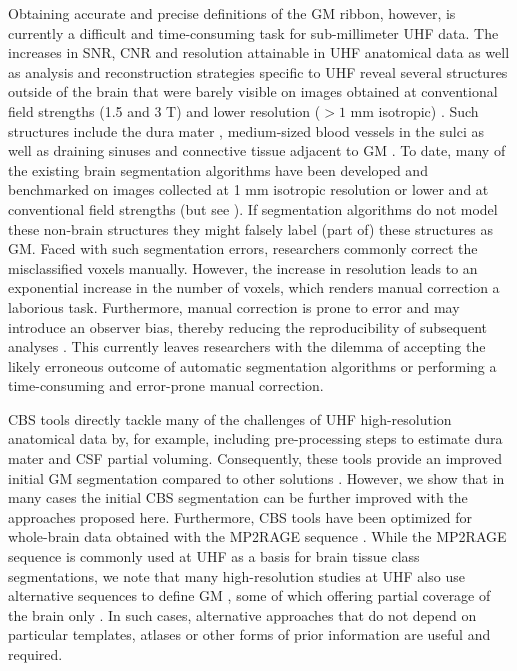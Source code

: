 Obtaining accurate and precise definitions of the GM ribbon, however, is currently a difficult and time-consuming task for sub-millimeter UHF data. The increases in SNR, CNR and resolution attainable in UHF anatomical data as well as analysis \cite{Moortele2009} and reconstruction \cite{Marques2010} strategies specific to UHF reveal several structures outside of the brain that were barely visible on images obtained at conventional field strengths (1.5 and 3 T) and lower resolution ($> 1$ mm isotropic) \cite{Viviani2017}. Such structures include the dura mater \cite{VanderKouwe2008}, medium-sized blood vessels in the sulci \cite{Viviani2016} as well as draining sinuses and connective tissue adjacent to GM \cite{Helms2006}. To date, many of the existing brain segmentation algorithms have been developed and benchmarked on images collected at 1 mm isotropic resolution or lower and at conventional field strengths \cite{Helms2016} (but see \cite{Bazin2014}). If segmentation algorithms do not model these non-brain structures they might falsely label (part of) these structures as GM. Faced with such segmentation errors, researchers commonly correct the misclassified voxels manually. However, the increase in resolution leads to an exponential increase in the number of voxels, which renders manual correction a laborious task. Furthermore, manual correction is prone to error and may introduce an observer bias, thereby reducing the reproducibility of subsequent analyses \cite{Despotovic2015}. This currently leaves researchers with the dilemma of accepting the likely erroneous outcome of automatic segmentation algorithms or performing a time-consuming and error-prone manual correction.

CBS tools \cite{Bazin2014} directly tackle many of the challenges of UHF high-resolution anatomical data by, for example, including pre-processing steps to estimate dura mater and CSF partial voluming. Consequently, these tools provide an improved initial GM segmentation compared to other solutions \cite{Bazin2014}. However, we show that in many cases the initial CBS segmentation can be further improved with the approaches proposed here. Furthermore, CBS tools have been optimized for whole-brain data obtained with the MP2RAGE sequence \cite{Marques2010}. While the MP2RAGE sequence is commonly used at UHF as a basis for brain tissue class segmentations, we note that many high-resolution studies at UHF also use alternative sequences to define GM \cite{Huber2015, Renvall2016, Kashyap2017,Moortele2009}, some of which offering partial coverage of the brain only \cite{Huber2015, Kashyap2017}. In such cases, alternative approaches that do not depend on particular templates, atlases or other forms of prior information are useful and required.

